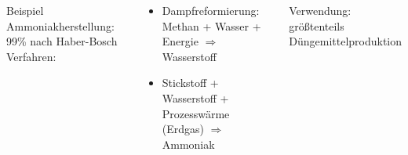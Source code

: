 \documentclass[10pt]{beamer}
\begin{document}
\begin{frame}
  \begin{columns}
  Beispiel Ammoniakherstellung: 99\% nach Haber-Bosch Verfahren\footnotemark:

  \begin{scriptsize}
    \begin{itemize}
      \item Dampfreformierung: Methan + Wasser + Energie $\Rightarrow$ Wasserstoff
      \item Stickstoff + Wasserstoff + Prozesswärme (Erdgas) $\Rightarrow$ Ammoniak
    \end{itemize}
  \end{scriptsize}

  Verwendung: größtenteils Düngemittelproduktion


\end{columns}
\end{frame}
\end{document}
